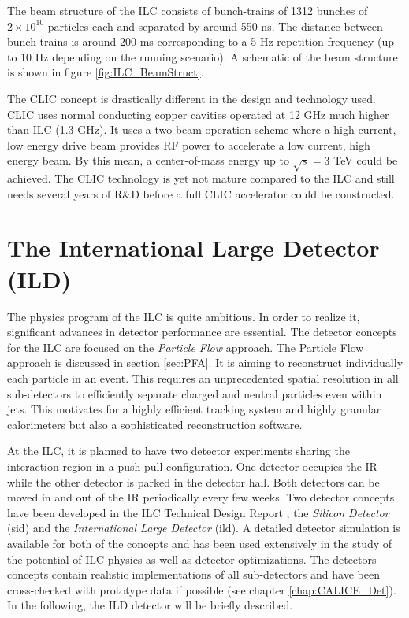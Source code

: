 The beam structure of the ILC consists of bunch-trains of 1312 bunches of $2 \times 10^{10}$ particles each and separated by around 550 ns. The distance between bunch-trains is around 200 ms corresponding to a 5 Hz repetition frequency (up to 10 Hz depending on the running scenario). A schematic of the beam structure is shown in figure \ref{fig:ILC_BeamStruct}.

The CLIC concept \cite{CLIC_CDR} is drastically different in the design and technology used. CLIC uses normal conducting copper cavities operated at 12 GHz much higher than ILC (1.3 GHz). It uses a two-beam operation scheme where a high current, low energy drive beam provides RF power to accelerate a low current, high energy beam. By this mean, a center-of-mass energy up to $\sqrt{s} = 3$ TeV could be achieved. The CLIC technology is yet not mature compared to the ILC and still needs several years of R\&D before a full CLIC accelerator could be constructed.

\section{The International Large Detector (ILD)}
\label{sec:ILD}

The physics program of the ILC is quite ambitious. In order to realize it, significant advances in detector performance are essential. The detector concepts for the ILC are focused on the \textit{Particle Flow} approach. The Particle Flow approach is discussed in section \ref{sec:PFA}. It is aiming to reconstruct individually each particle in an event. This requires an unprecedented spatial resolution in all sub-detectors to efficiently separate charged and neutral particles even within jets. This motivates for a highly efficient tracking system and highly granular calorimeters but also a sophisticated reconstruction software.

At the ILC, it is planned to have two detector experiments sharing the interaction region in a push-pull configuration. One detector occupies the IR while the other detector is parked in the detector hall. Both detectors can be moved in and out of the IR periodically every few weeks. Two detector concepts have been developed in the ILC Technical Design Report \cite{ILC_TDR_Vol4}, the \textit{Silicon Detector} (\acrshort{sid}) and the \textit{International Large Detector} (\acrshort{ild}). A detailed detector simulation is available for both of the concepts and has been used extensively in the study of the potential of ILC physics as well as detector optimizations. The detectors concepts contain realistic implementations of all sub-detectors and have been cross-checked with prototype data if possible (see chapter \ref{chap:CALICE_Det}). In the following, the ILD detector will be briefly described.

